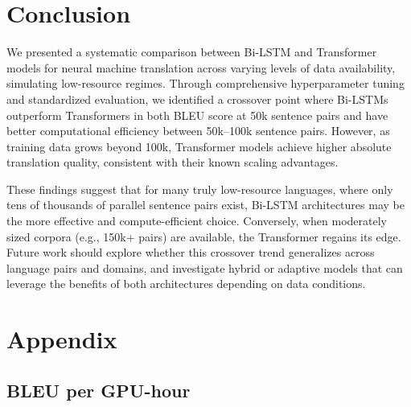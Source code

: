 \documentclass{article}
\begin{document}
\section{Conclusion}
\label{sec:conclusion}

We presented a systematic comparison between Bi-LSTM and Transformer models for neural machine translation across varying levels of data availability, simulating low-resource regimes. Through comprehensive hyperparameter tuning and standardized evaluation, we identified a crossover point where Bi-LSTMs outperform Transformers in both BLEU score at 50k sentence pairs and have better computational efficiency between 50k–100k sentence pairs. However, as training data grows beyond 100k, Transformer models achieve higher absolute translation quality, consistent with their known scaling advantages.

These findings suggest that for many truly low-resource languages, where only tens of thousands of parallel sentence pairs exist, Bi-LSTM architectures may be the more effective and compute-efficient choice. Conversely, when moderately sized corpora (e.g., 150k+ pairs) are available, the Transformer regains its edge. Future work should explore whether this crossover trend generalizes across language pairs and domains, and investigate hybrid or adaptive models that can leverage the benefits of both architectures depending on data conditions.





\appendix

\section{Appendix}
\subsection{BLEU per GPU-hour}
\end{document}
